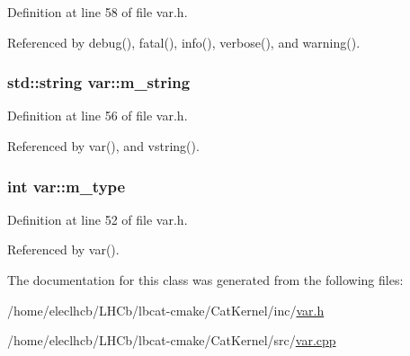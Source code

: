 Definition at line 58 of file var.h.

Referenced by debug(), fatal(), info(), verbose(), and warning().\hypertarget{classvar_a81567a7f3af11ceee9a0624648e0e904}{
\subsubsection[{m\_\-string}]{\setlength{\rightskip}{0pt plus 5cm}std::string {\bf var::m\_\-string}}}
\label{classvar_a81567a7f3af11ceee9a0624648e0e904}


Definition at line 56 of file var.h.

Referenced by var(), and vstring().\hypertarget{classvar_afd0bde61955d8a7541d3dcedc22ec2ad}{
\subsubsection[{m\_\-type}]{\setlength{\rightskip}{0pt plus 5cm}int {\bf var::m\_\-type}}}
\label{classvar_afd0bde61955d8a7541d3dcedc22ec2ad}


Definition at line 52 of file var.h.

Referenced by var().

The documentation for this class was generated from the following files:\begin{DoxyCompactItemize}
\item 
/home/eleclhcb/LHCb/lbcat-\/cmake/CatKernel/inc/\hyperlink{var_8h}{var.h}\item 
/home/eleclhcb/LHCb/lbcat-\/cmake/CatKernel/src/\hyperlink{var_8cpp}{var.cpp}\end{DoxyCompactItemize}
